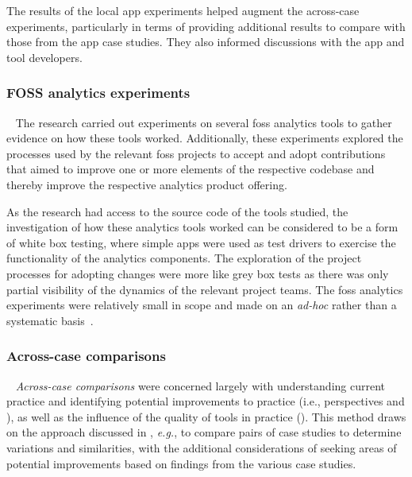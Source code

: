 The results of the local app experiments helped augment the across-case experiments, particularly in terms of providing additional results to compare with those from the app case studies. They also informed discussions with the app and tool developers. 

\subsubsection{FOSS analytics experiments}~\label{foss-contributions-research-methods}
The research carried out experiments on several \acrshort{foss} analytics tools to gather evidence on how these tools worked. Additionally, these experiments explored the processes used by the relevant \acrshort{foss} projects to accept and adopt contributions that aimed to improve one or more elements of the respective codebase and thereby improve the respective analytics product offering.

As the research had access to the source code of the tools studied, the investigation of how these analytics tools worked can be considered to be a form of white box testing, where simple apps were used as test drivers to exercise the functionality of the analytics components. The exploration of the project processes for adopting changes were more like grey box tests as there was only partial visibility of the dynamics of the relevant project teams. 
The \acrshort{foss} analytics experiments were relatively small in scope and made on an \emph{ad-hoc} rather than a systematic basis~.~

\subsubsection{Across-case comparisons}~\label{across-case-comparisons-research-method}
\textit{Across-case comparisons} were concerned largely with understanding current practice and identifying potential improvements to practice (i.e., perspectives \uuse and \iuse), as well as the influence of the quality of tools in practice (\itools). This method draws on the approach discussed in , \textit{e.g.}, to compare pairs of case studies to determine variations and similarities, with the additional considerations of seeking areas of potential improvements based on findings from the various case studies.

